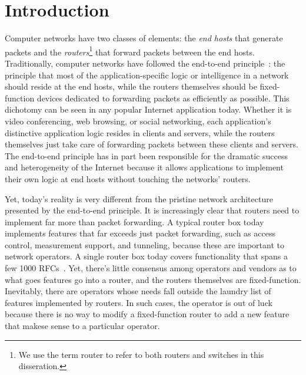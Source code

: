 \chapter{Introduction}
\label{chap:intro}


Computer networks have two classes of elements: the \textit{end hosts} that
generate packets and the \textit{routers}\footnote{We use the term router to
refer to both routers and switches in this disseration.} that forward packets
between the end hosts. Traditionally, computer networks have followed the
end-to-end principle~\cite{e2e}: the principle that most of the
application-specific logic or intelligence in a network should reside at the
end hosts, while the routers themselves should be fixed-function devices
dedicated to forwarding packets as efficiently as possible. This dichotomy can
be seen in any popular Internet application today. Whether it is video
conferencing, web browsing, or social networking, each application's
distinctive application logic resides in clients and servers, while the routers
themselves just take care of forwarding packets between these clients and
servers. The end-to-end principle has in part been responsible for the dramatic
success and heterogeneity of the Internet because it allows applications to
implement their own logic at end hosts without touching the networks' routers.

Yet, today's reality is very different from the pristine network architecture
presented by the end-to-end principle. It is increasingly clear that routers
need to implement far more than packet forwarding. A typical router box today
implements features that far exceeds just packet forwarding, such as access
control, measurement support, and tunneling, because these are important to
network operators. A single router box today covers functionality that spans a
few 1000 RFCs~\cite{lavanya_compiler}. Yet, there's little consensus among
operators and vendors as to what goes features go into a router, and the
routers themselves are fixed-function. Inevitably, there are operators whose
needs fall outside the laundry list of features implemented by routers. In such
cases, the operator is out of luck because there is no way to modify a
fixed-function router to add a new feature that makese sense to a particular
operator.

